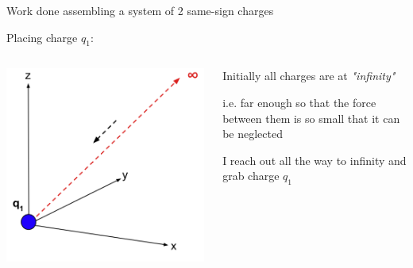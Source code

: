 %
%
%

\begin{frame}{Work done assembling a system of 2 same-sign charges}

Placing charge $q_1$:\\

\begin{columns}
  \begin{column}{0.45\textwidth}
   \begin{center}
     \includegraphics[width=0.99\textwidth]{./images/schematics/work_2_like_charges_2_q1.png}\\
   \end{center}
  \end{column}
  \begin{column}{0.54\textwidth}
   \begin{itemize}
   {\small
    \item Initially all charges are at {\em "infinity"}
       \begin{itemize}
       {\small
          \item i.e. far enough so that the force between them is so small that it can be neglected
       }
       \end{itemize}
    \vspace{0.2cm}
    \item I reach out all the way to infinity and grab charge $q_{1}$
}
\end{itemize}
\end{column}
\end{columns}
\end{frame}
